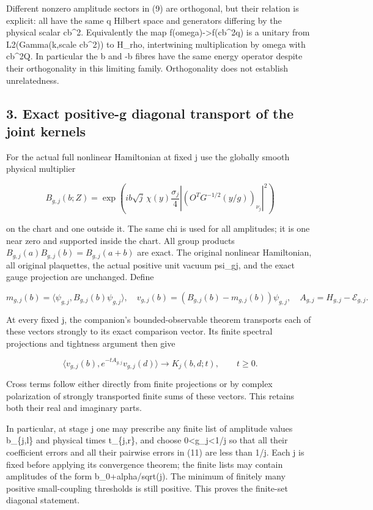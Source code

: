 \documentclass[
  11pt,
]{article}
\begin{document}
Different nonzero amplitude sectors in (9) are orthogonal, but their
relation is explicit: all have the same q Hilbert space and generators
differing by the physical scalar cb\^{}2. Equivalently the map
f(omega)-\textgreater f(cb\^{}2q) is a unitary from L2(Gamma(k,scale
cb\^{}2)) to H\_rho, intertwining multiplication by omega with cb\^{}2Q.
In particular the b and -b fibres have the same energy operator despite
their orthogonality in this limiting family. Orthogonality does not
establish unrelatedness.

\subsection{3. Exact positive-g diagonal transport of the joint
kernels}\label{weak-coupling-part-5-exact-positive-g-diagonal-transport-of-the-joint-kernels}

For the actual full nonlinear Hamiltonian at fixed j use the globally
smooth physical multiplier

\[
 B_{g,j}(b;Z)=
 \exp\left(ib\sqrt j\,\chi(y)
 \frac{\sigma_j}{4}
 \left|(O^TG^{-1/2}(y/g))_{\nu_j}\right|^2\right)
 \tag{10}
\]

on the chart and one outside it. The same chi is used for all
amplitudes; it is one near zero and supported inside the chart. All
group products \(B_{g,j}(a)B_{g,j}(b)=B_{g,j}(a+b)\) are exact. The
original nonlinear Hamiltonian, all original plaquettes, the actual
positive unit vacuum psi\_gj, and the exact gauge projection are
unchanged. Define

\[
 m_{g,j}(b)=\langle\psi_{g,j},B_{g,j}(b)\psi_{g,j}\rangle,
 \quad v_{g,j}(b)=(B_{g,j}(b)-m_{g,j}(b))\psi_{g,j},
 \quad A_{g,j}=H_{g,j}-\mathcal E_{g,j}.
\]

At every fixed j, the companion's bounded-observable theorem transports
each of these vectors strongly to its exact comparison vector. Its
finite spectral projections and tightness argument then give

\[
 \langle v_{g,j}(b),e^{-tA_{g,j}}v_{g,j}(d)\rangle
       \longrightarrow K_j(b,d;t),\qquad t\ge0.
 \tag{11}
\]

Cross terms follow either directly from finite projections or by complex
polarization of strongly transported finite sums of these vectors. This
retains both their real and imaginary parts.

In particular, at stage j one may prescribe any finite list of amplitude
values b\_\{j,l\} and physical times t\_\{j,r\}, and choose
0\textless g\_j\textless1/j so that all their coefficient errors and all
their pairwise errors in (11) are less than 1/j. Each j is fixed before
applying its convergence theorem; the finite lists may contain
amplitudes of the form b\_0+alpha/sqrt(j). The minimum of finitely many
positive small-coupling thresholds is still positive. This proves the
finite-set diagonal statement.
\end{document}
